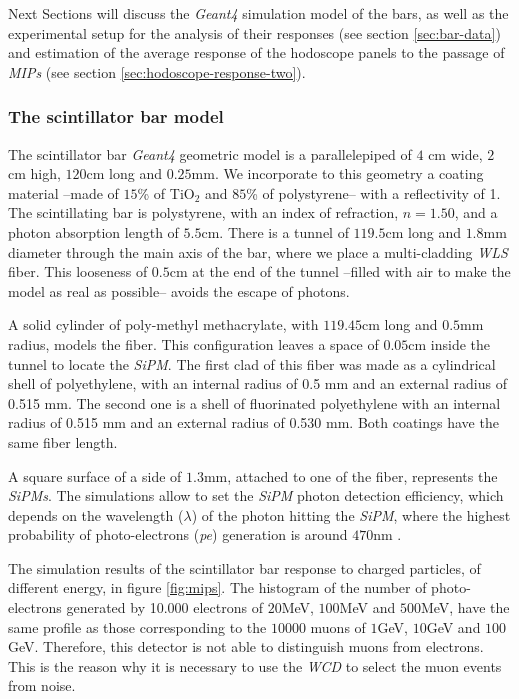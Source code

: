 \documentclass[submitting]{nst}
\begin{document}
Next Sections will discuss the \textsl{Geant4} simulation model of the bars, as well as the experimental setup for the analysis of their responses (see section \ref{sec:bar-data}) and estimation of the average response of the hodoscope panels to the passage of \textsl{MIPs} (see section \ref{sec:hodoscope-response-two}). %


\subsubsection{The scintillator bar model} \label{sec:bar-simulation}%
The scintillator bar \textsl{Geant4} geometric model is a parallelepiped of $4$ cm wide, $2$cm high, $120$cm long and $0.25$mm. We incorporate to this geometry a coating material --made of $15$\% of TiO$_2$ and $85$\% of polystyrene-- with a reflectivity of 1. The scintillating bar is polystyrene, with an index of refraction, $n =1.50$, and a photon absorption length of $5.5$cm. There is a tunnel of $119.5$cm long and $1.8$mm diameter through the main axis of the bar, where we place a multi-cladding \textsl{WLS} fiber. This looseness of $0.5$cm at the end of the tunnel --filled with air to make the model as real as possible-- avoids the escape of photons.

A solid cylinder of poly-methyl methacrylate, with $119.45$cm long and $0.5$mm radius, models the fiber. This configuration leaves a space of $0.05$cm inside the tunnel to locate the \textsl{SiPM}. The first clad of this fiber was made as a cylindrical shell of polyethylene, with an internal radius of 0.5 mm and an external radius of 0.515 mm. The second one is a shell of fluorinated polyethylene with an internal radius of 0.515 mm and an external radius of 0.530 mm. Both coatings have the same fiber length.

A square surface of a side of $1.3$mm, attached to one of the fiber, represents the \textsl{SiPMs}. The simulations allow to set the \textsl{SiPM} photon detection efficiency, which depends on the wavelength ($\lambda$) of the photon hitting the \textsl{SiPM}, where the highest probability of photo-electrons (\textsl{pe}) generation is around $470$nm \cite{Hamamatsu2018}. 

The simulation results of the scintillator bar response to charged particles, of different energy, in figure \ref{fig:mips}. The histogram of the number of photo-electrons generated by 10.000 electrons of $20$MeV, $100$MeV and $500$MeV, have the same profile as those corresponding to the $10000$ muons of $1$GeV, $10$GeV and $100$GeV. Therefore, this detector is not able to distinguish muons from electrons. This is the reason why it is necessary to use the \textsl{WCD} to select the muon events from noise. 
\end{document}
